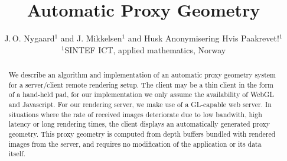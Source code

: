 

\title[Automatic Proxy Geometry]%
      {Automatic Proxy Geometry}

\author[J.\,O. Nygaard \& J. Mikkelsen]
       {J.\,O. Nygaard$^{1}$
        and J. Mikkelsen$^{1}$
        and Husk Anonymisering Hvis Paakrevet!$^{1}$
        \\
         $^1$SINTEF ICT, applied mathematics, Norway
       }


%





\maketitle

\begin{abstract}
   We describe an algorithm and implementation of an automatic proxy geometry
   system for a server/client remote rendering setup. The client may be a thin
   client in the form of a hand-held pad, for our implementation we only assume
   the availability of WebGL and Javascript. For our rendering server, we make
   use of a GL-capable web server. In situations where the rate of received
   images deteriorate due to low bandwith, high latency or long rendering times,
   the client displays an automatically generated proxy geometry. This proxy
   geometry is computed from depth buffers bundled with rendered images from the
   server, and requires no modification of the application or its data itself.

\begin{classification} %
\end{classification}

\end{abstract}




